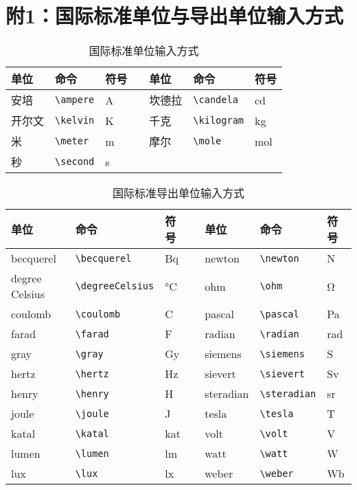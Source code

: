 \section{附1：国际标准单位与导出单位输入方式}

\begin{table}[htbp]
\centering{}
\caption{国际标准单位输入方式}
\begin{tabular}{lllp{10pt}lll}
\toprule
单位    & 命令  & 符号  &   & 单位    & 命令  & 符号  \\
\midrule
安培    & \verb|\ampere|    & \si{\ampere}   && 坎德拉  & \verb|\candela|   & \si{\candela}  \\
开尔文  & \verb|\kelvin|    & \si{\kelvin}   && 千克    & \verb|\kilogram|  & \si{\kilogram}    \\
米      & \verb|\meter|     & \si{\meter}    && 摩尔    & \verb|\mole|      & \si{\mole}    \\
秒      & \verb|\second|    & \si{\second}   &&     &        &      \\
\bottomrule
\end{tabular}
\end{table}

\begin{table}[htbp]
\centering{}
\caption{国际标准导出单位输入方式}
\begin{tabular}{lllp{10pt}lll}
\toprule
单位    & 命令  & 符号  &   & 单位    & 命令  & 符号  \\
\midrule
becquerel       & \verb|\becquerel|     & \si{\becquerel}       & & newton      & \verb|\newton|    & \si{\newton} \\
degree Celsius  & \verb|\degreeCelsius| & \si{\degreeCelsius}   & & ohm         & \verb|\ohm|       & \si{\ohm}\\
coulomb         & \verb|\coulomb|       & \si{\coulomb}         & & pascal      & \verb|\pascal|    & \si{\pascal}\\
farad           & \verb|\farad|         & \si{\farad}           & & radian      & \verb|\radian|    & \si{\radian} \\
gray            & \verb|\gray|          & \si{\gray}            & & siemens     & \verb|\siemens|   & \si{\siemens}    \\
hertz           & \verb|\hertz|         & \si{\hertz}           & & sievert     & \verb|\sievert|   & \si{\sievert}\\
henry           & \verb|\henry|         & \si{\henry}           & & steradian   & \verb|\steradian| & \si{\steradian}\\
joule           & \verb|\joule|         & \si{\joule}           & & tesla       & \verb|\tesla|     & \si{\tesla}\\
katal           & \verb|\katal|         & \si{\katal}           & & volt        & \verb|\volt|      & \si{\volt}\\
lumen           & \verb|\lumen|         & \si{\lumen}           & & watt        & \verb|\watt|      & \si{\watt}\\
lux             & \verb|\lux|           & \si{\lux}             & & weber       & \verb|\weber|     & \si{\weber}\\
\bottomrule
\end{tabular}
\end{table}
